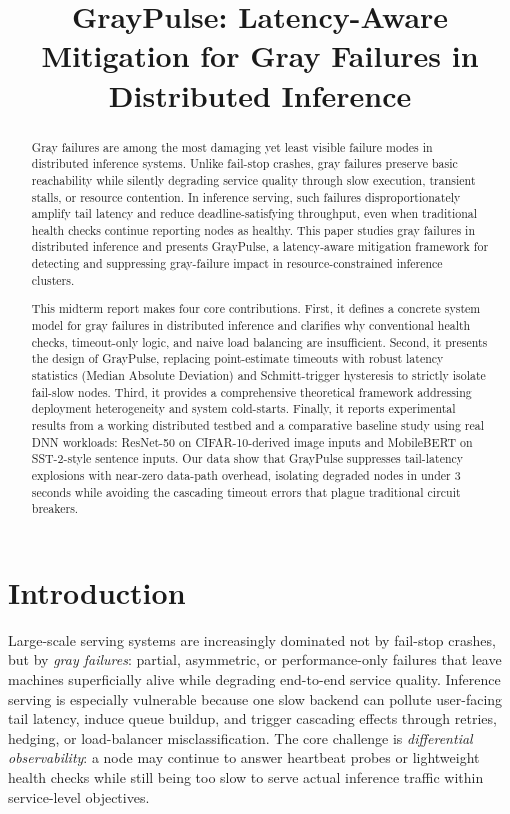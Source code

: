 \documentclass[12pt,conference]{IEEEtran}
\title{GrayPulse: Latency-Aware Mitigation for Gray Failures in Distributed Inference}
\author{
    \IEEEauthorblockN{Jisheng Jiang}
    \IEEEauthorblockA{\textit{University of Illinois Urbana-Champaign} \\
    jisheng3@illinois.edu}
    \and
    \IEEEauthorblockN{Maojie Xu}
    \IEEEauthorblockA{\textit{University of Illinois Urbana-Champaign} \\
    maojie2@illinois.edu}
}
\begin{document}
\maketitle

\begin{abstract}
Gray failures are among the most damaging yet least visible failure modes in distributed inference systems. Unlike fail-stop crashes, gray failures preserve basic reachability while silently degrading service quality through slow execution, transient stalls, or resource contention. In inference serving, such failures disproportionately amplify tail latency and reduce deadline-satisfying throughput, even when traditional health checks continue reporting nodes as healthy. This paper studies gray failures in distributed inference and presents GrayPulse, a latency-aware mitigation framework for detecting and suppressing gray-failure impact in resource-constrained inference clusters.

This midterm report makes four core contributions. First, it defines a concrete system model for gray failures in distributed inference and clarifies why conventional health checks, timeout-only logic, and naive load balancing are insufficient. Second, it presents the design of GrayPulse, replacing point-estimate timeouts with robust latency statistics (Median Absolute Deviation) and Schmitt-trigger hysteresis to strictly isolate fail-slow nodes. Third, it provides a comprehensive theoretical framework addressing deployment heterogeneity and system cold-starts. Finally, it reports experimental results from a working distributed testbed and a comparative baseline study using real DNN workloads: ResNet-50 on CIFAR-10-derived image inputs and MobileBERT on SST-2-style sentence inputs. Our data show that GrayPulse suppresses tail-latency explosions with near-zero data-path overhead, isolating degraded nodes in under 3 seconds while avoiding the cascading timeout errors that plague traditional circuit breakers.
\end{abstract}

\section{Introduction}

Large-scale serving systems are increasingly dominated not by fail-stop crashes, but by \emph{gray failures}: partial, asymmetric, or performance-only failures that leave machines superficially alive while degrading end-to-end service quality. Inference serving is especially vulnerable because one slow backend can pollute user-facing tail latency, induce queue buildup, and trigger cascading effects through retries, hedging, or load-balancer misclassification. The core challenge is \emph{differential observability}: a node may continue to answer heartbeat probes or lightweight health checks while still being too slow to serve actual inference traffic within service-level objectives.
\end{document}
